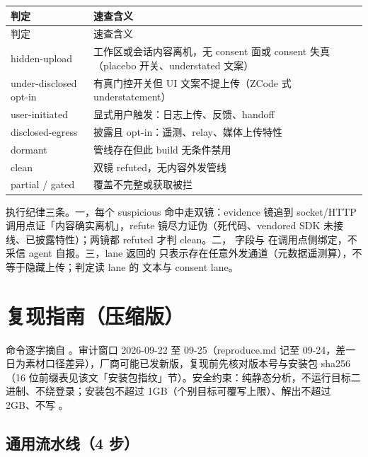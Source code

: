 {\footnotesize
\begin{longtable}{@{}p{4.0cm}p{10.4cm}@{}}
\toprule
判定 & 速查含义 \\
\midrule
\endfirsthead
\toprule
判定 & 速查含义 \\
\midrule
\endhead
\midrule
\endfoot
\bottomrule
\endlastfoot
hidden-upload & 工作区或会话内容离机，无 consent 面或 consent 失真（placebo 开关、understated 文案） \\
under-disclosed opt-in & 有真门控开关但 UI 文案不提上传（ZCode 式 understatement） \\
user-initiated & 显式用户触发：日志上传、反馈、handoff \\
disclosed-egress & 披露且 opt-in：遥测、relay、媒体上传特性 \\
dormant & 管线存在但此 build 无条件禁用 \\
clean & 双镜 refuted，无内容外发管线 \\
partial / gated & 覆盖不完整或获取被拦 \\
\end{longtable}
}

执行纪律三条。一，每个 suspicious 命中走双镜：evidence 镜追到 socket/HTTP 调用点证「内容确实离机」，refute 镜尽力证伪（死代码、vendored SDK 未接线、已披露特性）；两镜都 refuted 才判 clean。二， 字段与  在调用点侧绑定，不采信 agent 自报。三，lane 返回的  只表示存在任意外发通道（元数据遥测算），不等于隐藏上传；判定读 lane 的  文本与 consent lane。


\chapter{复现指南（压缩版）}
\label{app:reproduce}

命令逐字摘自 。审计窗口 2026-09-22 至 09-25（reproduce.md 记至 09-24，差一日为素材口径差异），厂商可能已发新版，复现前先核对版本号与安装包 sha256（16 位前缀表见该文「安装包指纹」节）。安全约束：纯静态分析，不运行目标二进制、不绕登录；安装包不超过 1GB（个别目标可覆写上限）、解出不超过 2GB、不写 。

\section{通用流水线（4 步）}


